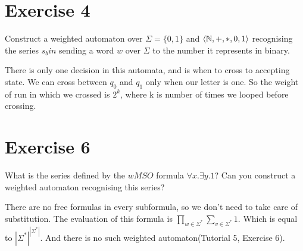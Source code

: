 \documentclass{article}
\begin{document}
\section{Exercise 4}
Construct a weighted automaton over $\Sigma = \{0,1\}$ and $\langle \mathbb{N}, +, *, 0, 1 \rangle$ recognising the series $s_bin$ sending a word $w$ over $\Sigma$ to the number it represents in binary.

\begin{center}
\end{center}
There is only one decision in this automata, and is when to cross to accepting state. We can cross between $q_0$ and $q_1$ only when our letter is one. So the weight of run in which we crossed is $2^k$, where k is number of times we looped before crossing.  


\section{Exercise 6}
What is the series defined by the $wMSO$ formula $\forall x. \exists y. 1$? Can you construct a weighted automaton recognising this series?

There are no free formulas in every subformula, so we don't need to take care of substitution.
The evaluation of this formula is $\prod_{w \in \Sigma^*} \sum_{v \in \Sigma^*} 1$. Which is equal to $|\Sigma^*|^{|\Sigma^*|}$. And there is no such weighted automaton(Tutorial 5, Exercise 6). 
\end{document}
